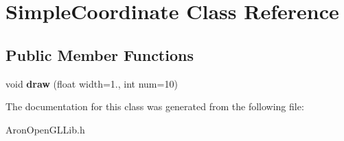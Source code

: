 \hypertarget{class_simple_coordinate}{}\section{Simple\+Coordinate Class Reference}
\label{class_simple_coordinate}
\subsection*{Public Member Functions}
\begin{DoxyCompactItemize}
\item 
\mbox{\label{class_simple_coordinate_aa3f1d2894a4a1f060f40bd8f3a9e3b91}} 
void {\bfseries draw} (float width=1., int num=10)
\end{DoxyCompactItemize}


The documentation for this class was generated from the following file\+:\begin{DoxyCompactItemize}
\item 
Aron\+Open\+G\+L\+Lib.\+h\end{DoxyCompactItemize}

